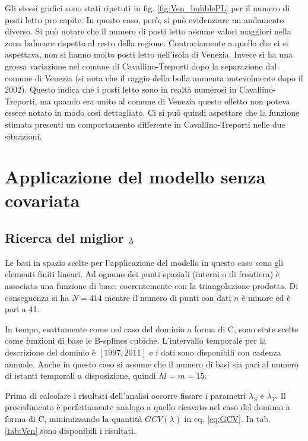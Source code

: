 \documentclass[a4paper,11pt,twoside,openright]{book}							%
\begin{document}
Gli stessi grafici sono stati ripetuti in fig. \ref{fig:Ven_bubblePL} per il numero di posti letto pro capite. In questo caso, però, si può evidenziare un andamento diverso. Si può notare che il numero di posti letto assume valori maggiori nella zona balneare rispetto al resto della regione. Contrariamente a quello che ci si aspettava, non si hanno molto posti letto nell'isola di Venezia. Invece si ha una grossa variazione nel comune di Cavallino-Treporti dopo la separazione dal comune di Venezia (si nota che il raggio della bolla aumenta notevolmente dopo il 2002). Questo indica che i posti letto sono in realtà numerosi in Cavallino-Treporti, ma quando era unito al comune di Venezia questo effetto non poteva essere notato in modo così dettagliato. Ci si può quindi aspettare che la funzione stimata presenti un comportamento differente in Cavallino-Treporti nelle due situazioni.


\section{Applicazione del modello senza covariata}

\subsection{Ricerca del miglior $\protect\underline{\lambda}$}
Le basi in spazio scelte per l'applicazione del modello in questo caso sono gli elementi finiti lineari. Ad ognuno dei punti spaziali (interni o di frontiera) è associata una funzione di base, coerentemente con la triangolazione prodotta. Di conseguenza si ha $N=414$ mentre il numero di punti con dati $n$ è minore ed è pari a 41.

In tempo, esattamente come nel caso del dominio a forma di C, sono state scelte come funzioni di base le B-splines cubiche. L'intervallo temporale per la descrizione del dominio è $[1997,2011]$ e i dati sono disponibili con cadenza annuale. Anche in questo caso si assume che il numero di basi sia pari al numero di istanti temporali a disposizione, quindi $M=m=15$.

Prima di calcolare i risultati dell'analisi occorre fissare i parametri $\lambda_S$ e $\lambda_T$. Il procedimento è perfettamente analogo a quello ricavato nel caso del dominio a forma di C, minimizzando la quantità $GCV(\underline \lambda)$ in eq. \ref{eq:GCV}. In tab. \ref{tab:Ven} sono disponibili i risultati.
\end{document}
